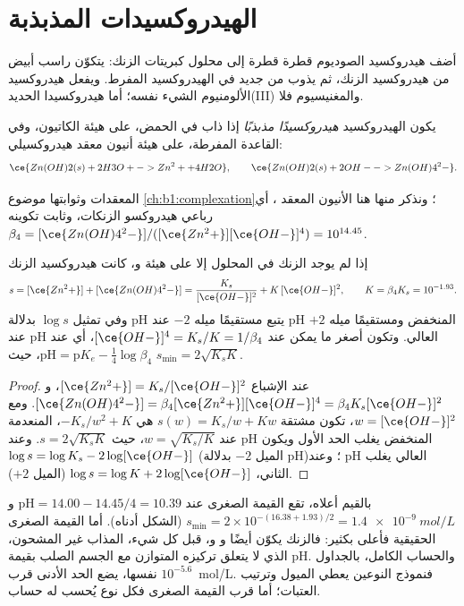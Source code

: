 \section{الهيدروكسيدات المذبذبة}\label{sec:b1:precipitation:amphoteric}

أضف هيدروكسيد الصوديوم قطرة قطرة إلى محلول كبريتات الزنك: يتكوّن راسب
أبيض من هيدروكسيد الزنك، ثم يذوب من جديد في الهيدروكسيد
المفرط. ويفعل هيدروكسيد الألومنيوم الشيء نفسه؛ أما هيدروكسيدا الحديد(III)
والمغنيسيوم فلا.

\begin{definition}\label{def:b1:precipitation:amphoteric-hydroxide}
يكون الهيدروكسيد \emph{هيدروكسيدًا مذبذبًا}
إذا ذاب في الحمض، على هيئة الكاتيون، وفي القاعدة المفرطة، على هيئة
أنيون معقد هيدروكسيلي:
\[
  \ce{Zn(OH)2(s) + 2H3O+ -> Zn^2+ + 4H2O}, \qquad
  \ce{Zn(OH)2(s) + 2OH- -> Zn(OH)4^2-} .
\]
\end{definition}

المعقدات وثوابتها موضوع \cref{ch:b1:complexation}؛ ونذكر منها هنا
الأنيون المعقد ، أي رباعي هيدروكسو الزنكات، وثابت تكوينه
$\beta_4 = [\ce{Zn(OH)4^2-}]/([\ce{Zn^2+}][\ce{OH-}]^4)
= 10^{14.45}$.

\begin{proposition}\label{prop:b1:precipitation:amphoteric}
إذا لم يوجد الزنك في المحلول إلا على هيئة  و، كانت
 هيدروكسيد الزنك
\[
  s = [\ce{Zn^2+}] + [\ce{Zn(OH)4^2-}] = \frac{K_s}{[\ce{OH-}]^2} + K\,[\ce{OH-}]^2,
  \qquad K = \beta_4 K_s = 10^{-1.93} .
\]
وفي تمثيل $\log s$ بدلالة pH يتبع مستقيمًا ميله $-2$ عند pH المنخفض ومستقيمًا
ميله $+2$ عند pH العالي. وتكون أصغر ما يمكن عند
$[\ce{OH-}]^4 = K_s/K = 1/\beta_4$، أي عند $\mathrm{pH} =
\mathrm{p}K_e - \frac14\log\beta_4$، حيث $s_{\min} = 2\sqrt{K_s K}$.
\end{proposition}

\begin{proof}
عند الإشباع $[\ce{Zn^2+}] = K_s/[\ce{OH-}]^2$،
و$[\ce{Zn(OH)4^2-}] = \beta_4[\ce{Zn^2+}][\ce{OH-}]^4 = \beta_4 K_s
[\ce{OH-}]^2$. ومع $w = [\ce{OH-}]^2$، تكون مشتقة $s(w) = K_s/w + Kw$ هي
$-K_s/w^2 + K$، المنعدمة عند $w = \sqrt{K_s/K}$، حيث $s = 2\sqrt{K_s K}$. وعند
pH المنخفض يغلب الحد الأول ويكون $\log s = \log K_s - 2\log[\ce{OH-}]$
(الميل $-2$ بدلالة pH)؛ وعند pH العالي يغلب الثاني، $\log s = \log K + 2\log[\ce{OH-}]$
(الميل $+2$).
\end{proof}

بالقيم أعلاه، تقع القيمة الصغرى عند $\mathrm{pH} = 14.00 - 14.45/4
= 10.39$ و$s_{\min} = 2 \times 10^{-(16.38 + 1.93)/2} =
\qty{1.4e-9}{mol/L}$
(الشكل أدناه). أما القيمة الصغرى
الحقيقية فأعلى بكثير: فالزنك يكوّن أيضًا  و و،
قبل كل شيء،  المذاب غير المشحون، الذي لا يتعلق تركيزه
المتوازن مع الجسم الصلب بقيمة pH. والحساب الكامل،
بالجداول نفسها، يضع الحد الأدنى قرب
$10^{-5.6}$~mol/L. فنموذج النوعين يعطي الميول وترتيب
العتبات؛ أما قرب القيمة الصغرى فكل نوع يُحسب له حساب.

